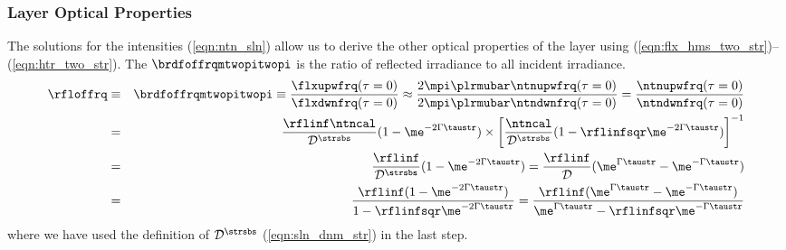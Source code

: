 \documentclass[12pt]{article}
\newcommand{\slndnm}{\ensuremath{\mathcal{D}}} %
\newcommand{\slndnmstr}{\ensuremath{\slndnm^{\strsbs}}} %
\begin{document}
\subsubsection[Layer Optical Properties]{Layer Optical Properties}\label{sxn:two_srm_lop}
The solutions for the intensities (\ref{eqn:ntn_sln}) allow us to
derive the other optical properties of the layer using
(\ref{eqn:flx_hms_two_str})--(\ref{eqn:htr_two_str}).
The 
$\brdfoffrqmtwopitwopi$ is the ratio of reflected irradiance to all
incident irradiance.  
\begin{eqnarray}
\rfloffrq & \equiv & \brdfoffrqmtwopitwopi \equiv 
\frac{\flxupwfrq(\tau = 0)}{\flxdwnfrq(\tau = 0)} \approx
\frac{2 \mpi \plrmubar \ntnupwfrq(\tau = 0)}
{2 \mpi \plrmubar \ntndwnfrq(\tau = 0)}
=
\frac{\ntnupwfrq(\tau = 0)}{\ntndwnfrq(\tau = 0)} \nonumber \\
& = & 
\frac{\rflinf \ntncal}{\slndnmstr} ( 1 - \me^{-2\Gamma \taustr} )
\times
\left[ \frac{\ntncal}{\slndnmstr}
(1 - \rflinfsqr \me^{-2\Gamma \taustr}) \right]^{-1} \nonumber \\
& = & 
\frac{\rflinf}{\slndnmstr}(1 - \me^{-2\Gamma \taustr})
= \frac{\rflinf}{\slndnm}(\me^{\Gamma \taustr} - \me^{-\Gamma \taustr})
\nonumber \\
& = & 
\frac{\rflinf(1 - \me^{-2\Gamma \taustr})}{1 - \rflinfsqr \me^{-2\Gamma \taustr}}
= \frac{\rflinf(\me^{\Gamma \taustr} - \me^{-\Gamma \taustr})}
{\me^{\Gamma \taustr} - \rflinfsqr \me^{-\Gamma \taustr}}
\label{eqn:flx_rfl_two_srm}
\end{eqnarray}
where we have used the definition of $\slndnmstr$
(\ref{eqn:sln_dnm_str}) in the last step.
\end{document}
